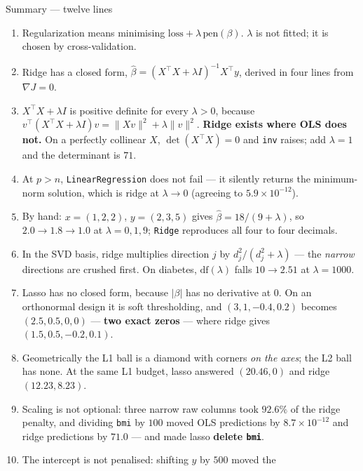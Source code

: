 \documentclass[aspectratio=169]{beamer}
\begin{document}
\begin{frame}[shrink=16]{Summary --- twelve lines}
  \begin{enumerate}\small
    \item Regularization means minimising
      $\text{loss} + \lambda\,\text{pen}(\beta)$. $\lambda$ is not fitted; it
      is chosen by cross-validation.
    \item Ridge has a closed form,
      $\hat\beta = (X^{\!\top}\!X + \lambda I)^{-1}X^{\!\top}y$, derived in
      four lines from $\nabla J = 0$.
    \item $X^{\!\top}\!X + \lambda I$ is positive definite for every
      $\lambda>0$, because
      $v^{\!\top}(X^{\!\top}\!X+\lambda I)v = \|Xv\|^2 + \lambda\|v\|^2$.
      \textbf{Ridge exists where OLS does not.} On a perfectly collinear
      $X$, $\det(X^{\!\top}\!X) = 0$ and \texttt{inv} raises; add $\lambda=1$
      and the determinant is $71$.
    \item At $p>n$, \texttt{LinearRegression} does not fail --- it silently
      returns the minimum-norm solution, which is ridge at $\lambda\to 0$
      (agreeing to $5.9\times10^{-12}$).
    \item By hand: $x=(1,2,2)$, $y=(2,3,5)$ gives
      $\hat\beta = 18/(9+\lambda)$, so $2.0 \to 1.8 \to 1.0$ at
      $\lambda = 0, 1, 9$; \texttt{Ridge} reproduces all four to four
      decimals.
    \item In the SVD basis, ridge multiplies direction $j$ by
      $d_j^2/(d_j^2+\lambda)$ --- the \emph{narrow} directions are crushed
      first. On diabetes, $\mathrm{df}(\lambda)$ falls $10 \to 2.51$ at
      $\lambda = 1000$.
    \item Lasso has no closed form, because $|\beta|$ has no derivative at
      $0$. On an orthonormal design it is soft thresholding, and
      $(3, 1, -0.4, 0.2)$ becomes $(2.5, 0.5, 0, 0)$ --- \textbf{two exact
      zeros} --- where ridge gives $(1.5, 0.5, -0.2, 0.1)$.
    \item Geometrically the L1 ball is a diamond with corners \emph{on the
      axes}; the L2 ball has none. At the same L1 budget, lasso answered
      $(20.46, 0)$ and ridge $(12.23, 8.23)$.
    \item Scaling is not optional: three narrow raw columns took $92.6\%$ of
      the ridge penalty, and dividing \texttt{bmi} by $100$ moved OLS
      predictions by $8.7\times10^{-12}$ and ridge predictions by
      $\mathbf{71.0}$ --- and made lasso \textbf{delete \texttt{bmi}}.
    \item The intercept is not penalised: shifting $y$ by $500$ moved the

\end{enumerate}
\end{frame}
\end{document}
